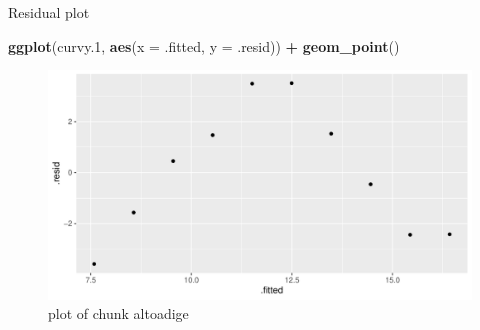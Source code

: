 \documentclass[ignorenonframetext,]{beamer}
\newenvironment{Shaded}{\begin{snugshade}}{\end{snugshade}}
\newcommand{\DataTypeTok}[1]{\textcolor[rgb]{0.13,0.29,0.53}{#1}}
\newcommand{\FloatTok}[1]{\textcolor[rgb]{0.00,0.00,0.81}{#1}}
\newcommand{\KeywordTok}[1]{\textcolor[rgb]{0.13,0.29,0.53}{\textbf{#1}}}
\newcommand{\NormalTok}[1]{#1}
\newcommand{\OperatorTok}[1]{\textcolor[rgb]{0.81,0.36,0.00}{\textbf{#1}}}
\newcommand{\StringTok}[1]{\textcolor[rgb]{0.31,0.60,0.02}{#1}}
\begin{document}
\begin{frame}[fragile]{Residual plot}
\protect\hypertarget{residual-plot-1}{}

\begin{Shaded}
\begin{Highlighting}[]
\KeywordTok{ggplot}\NormalTok{(curvy}\FloatTok{.1}\NormalTok{, }\KeywordTok{aes}\NormalTok{(}\DataTypeTok{x =}\NormalTok{ .fitted, }\DataTypeTok{y =}\NormalTok{ .resid)) }\OperatorTok{+}\StringTok{ }\KeywordTok{geom_point}\NormalTok{()}
\end{Highlighting}
\end{Shaded}

\begin{figure}
\centering
\includegraphics{figure/altoadige-1.pdf}
\caption{plot of chunk altoadige}
\end{figure}

\end{frame}
\end{document}
